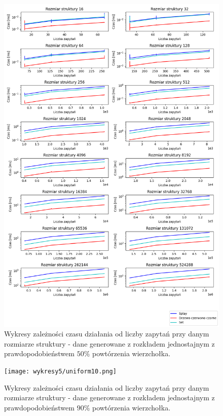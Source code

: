 \documentclass[declaration,shortabstract]{iithesis}
\theoremstyle{thm}
\theoremstyle{remark}
\theoremstyle{plain}
\theoremstyle{plain}
\theoremstyle{plain}
\begin{document}
\begin{figure}[H]  
\centering
    \includegraphics[scale=0.45]{wykresy3/uniform50.png}
      \caption{Wykresy zależności czasu działania od liczby zapytań przy danym rozmiarze struktury - dane generowane z rozkładem jednostajnym z prawdopodobieństwem  \(50\%\) powtórzenia wierzchołka. }  
\end{figure}

\begin{figure}[H]  
\centering
    \texttt{[image: wykresy5/uniform10.png]}
      \caption{Wykresy zależności czasu działania od liczby zapytań przy danym rozmiarze struktury - dane generowane z rozkładem jednostajnym z prawdopodobieństwem  \(90\%\) powtórzenia wierzchołka. }  
\end{figure}
\end{document}
